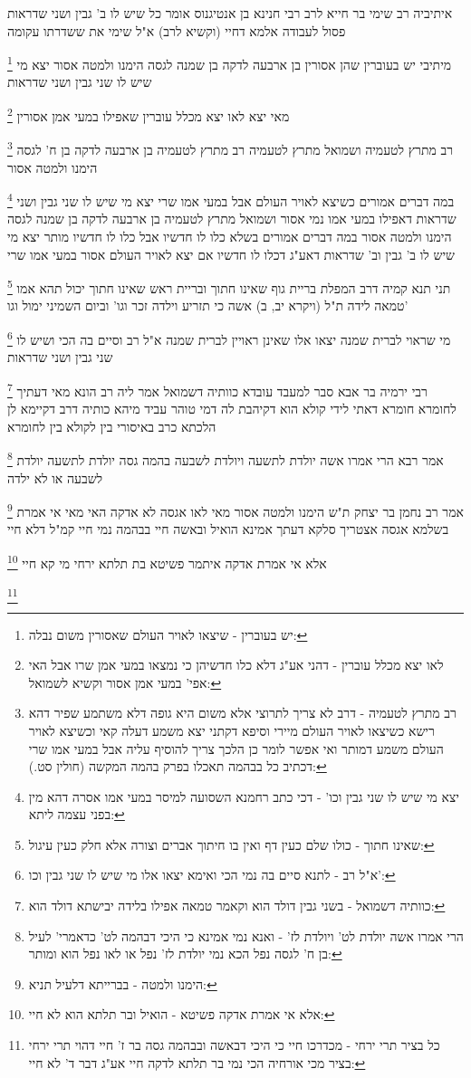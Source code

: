 \documentclass[12pt, openany]{book}
\newcommand{\footnotecomment}[1]{
	\renewcommand\thefootnote{}
	\footnote{#1}}
\newcommand{\commenta}[1]{\footnotecomment{#1}}
\begin{document}
{{איתיביה רב שימי בר חייא לרב רבי חנינא בן אנטיגנוס אומר כל שיש לו ב' גבין ושני שדראות פסול לעבודה אלמא דחיי (וקשיא לרב) א"ל שימי את ששדרתו עקומה 
\commenta{יש בעוברין - שיצאו לאויר העולם שאסורין משום נבלה:}
מיתיבי יש בעוברין שהן אסורין בן ארבעה לדקה בן שמנה לגסה הימנו ולמטה אסור יצא מי שיש לו שני גבין ושני שדראות 
\commenta{לאו יצא מכלל עוברין - דהני אע"ג דלא כלו חדשיהן כי נמצאו במעי אמן שרו אבל האי אפי' במעי אמן אסור וקשיא לשמואל:}
מאי יצא לאו יצא מכלל עוברין שאפילו במעי אמן אסורין 
\commenta{רב מתרץ לטעמיה - דרב לא צריך לתרוצי אלא משום היא גופה דלא משתמע שפיר דהא רישא כשיצאו לאויר העולם מיירי וסיפא דקתני יצא משמע דעלה קאי וכשיצא לאויר העולם משמע דמותר ואי אפשר לומר כן הלכך צריך להוסיף עליה אבל במעי אמו שרי דכתיב כל בבהמה תאכלו בפרק בהמה המקשה (חולין סט.):}
רב מתרץ לטעמיה ושמואל מתרץ לטעמיה רב מתרץ לטעמיה בן ארבעה לדקה בן ח' לגסה הימנו ולמטה אסור 
\commenta{יצא מי שיש לו שני גבין וכו' - דכי כתב רחמנא השסועה למיסר במעי אמו אסרה דהא מין בפני עצמה ליתא:}
במה דברים אמורים כשיצא לאויר העולם אבל במעי אמו שרי יצא מי שיש לו שני גבין ושני שדראות דאפילו במעי אמו נמי אסור
ושמואל מתרץ לטעמיה בן ארבעה לדקה בן שמנה לגסה הימנו ולמטה אסור במה דברים אמורים בשלא כלו לו חדשיו אבל כלו לו חדשיו מותר יצא מי שיש לו ב' גבין וב' שדראות דאע"ג דכלו לו חדשיו אם יצא לאויר העולם אסור במעי אמו שרי 
\commenta{שאינו חתוך - כולו שלם כעין דף ואין בו חיתוך אברים וצורה אלא חלק כעין עיגול:}
תני תנא קמיה דרב המפלת בריית גוף שאינו חתוך ובריית ראש שאינו חתוך יכול תהא אמו טמאה לידה ת"ל (ויקרא יב, ב) אשה כי תזריע וילדה זכר וגו' וביום השמיני ימול וגו'
\commenta{א"ל רב - לתנא סיים בה נמי הכי ואימא יצאו אלו מי שיש לו שני גבין וכו':}
מי שראוי לברית שמנה יצאו אלו שאינן ראויין לברית שמנה א"ל רב וסיים בה הכי ושיש לו שני גבין ושני שדראות 
\commenta{כוותיה דשמואל - בשני גבין דולד הוא וקאמר טמאה אפילו בלידה יבישתא דולד הוא:}
רבי ירמיה בר אבא סבר למעבד עובדא כוותיה דשמואל אמר ליה רב הונא מאי דעתיך לחומרא חומרא דאתי לידי קולא הוא דקיהבת לה דמי טוהר עביד מיהא כותיה דרב דקיימא לן הלכתא כרב באיסורי בין לקולא בין לחומרא 
\commenta{הרי אמרו אשה יולדת לט' ויולדת לז' - ואנא נמי אמינא כי היכי דבהמה לט' כדאמרי' לעיל בן ח' לגסה נפל הכא נמי יולדת לז' נפל או לאו נפל הוא ומותר:}
אמר רבא הרי אמרו אשה יולדת לתשעה ויולדת לשבעה בהמה גסה יולדת לתשעה יולדת לשבעה או לא ילדה 
\commenta{הימנו ולמטה - בברייתא דלעיל תניא:}
אמר רב נחמן בר יצחק ת"ש הימנו ולמטה אסור מאי לאו אגסה לא אדקה 
האי מאי אי אמרת בשלמא אגסה אצטריך סלקא דעתך אמינא הואיל ובאשה חיי בבהמה נמי חיי קמ"ל דלא חיי 
\commenta{אלא אי אמרת אדקה פשיטא - הואיל ובר תלתא הוא לא חיי:}
אלא אי אמרת אדקה איתמר פשיטא בת תלתא ירחי מי קא חיי 
\commenta{כל בציר תרי ירחי - מכדרכו חיי כי היכי דבאשה ובבהמה גסה בר ז' חיי דהוי תרי ירחי בציר מכי אורחיה הכי נמי בר תלתא לדקה חיי אע"ג דבר ד' לא חיי:}
}}
\end{document}
